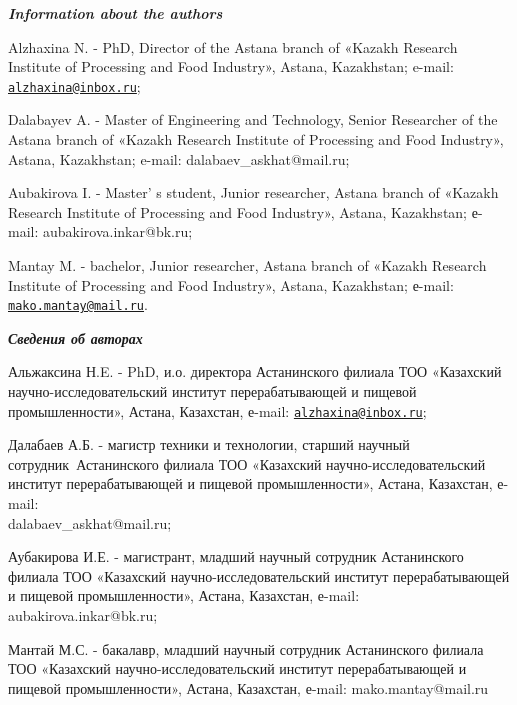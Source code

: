 \begin{authorinfo}
\emph{{\bfseries Information about the authors}}

Alzhaxina N. - PhD, Director of the Astana branch of «Kazakh Research
Institute of Processing and Food Industry», Astana, Kazakhstan; e-mail:
\href{mailto:alzhaxina@inbox.ru}{\nolinkurl{alzhaxina@inbox.ru}};

Dalabayev A. - Master of Engineering and Technology, Senior Researcher
of the Astana branch of «Kazakh Research Institute of Processing and
Food Industry», Astana, Kazakhstan; e-mail: dalabaev\_askhat@mail.ru;

Aubakirova I. - Master' s student, Junior researcher,
Astana branch of «Kazakh Research Institute of Processing and Food
Industry», Astana, Kazakhstan; е-mail: aubakirova.inkar@bk.ru;

Mantay M. - bachelor, Junior researcher, Astana branch of «Kazakh
Research Institute of Processing and Food Industry», Astana, Kazakhstan;
е-mail:
\href{mailto:mako.mantay@mail.ru}{\nolinkurl{mako.mantay@mail.ru}}.

\emph{{\bfseries Сведения об авторах}}

Альжаксина Н.E. - PhD, и.о. директора Астанинского филиала ТОО
«Казахский научно-исследовательский институт перерабатывающей и пищевой
промышленности», Астана, Казахстан, е-mail:
\href{mailto:alzhaxina@inbox.ru}{\nolinkurl{alzhaxina@inbox.ru}};

Далабаев А.Б. - магистр техники и технологии, старший научный
сотрудник~Астанинского филиала ТОО «Казахский научно-исследовательский
институт перерабатывающей и пищевой промышленности», Астана, Казахстан,
е-mail: \\dalabaev\_askhat@mail.ru;

Аубакирова И.Е. - магистрант, младший научный сотрудник Астанинского
филиала ТОО «Казахский научно-исследоват\-ельский институт
перерабатывающей и пищевой промышленности», Астана, Казахстан, е-mail:
aubakirova.inkar@bk.ru;

Мантай М.С. - бакалавр, младший научный сотрудник Астанинского филиала
ТОО «Казахский научно-исследователь\-ский институт перерабатывающей и
пищевой промышленности», Астана, Казахстан, е-mail: mako.mantay@mail.ru~
\end{authorinfo}
